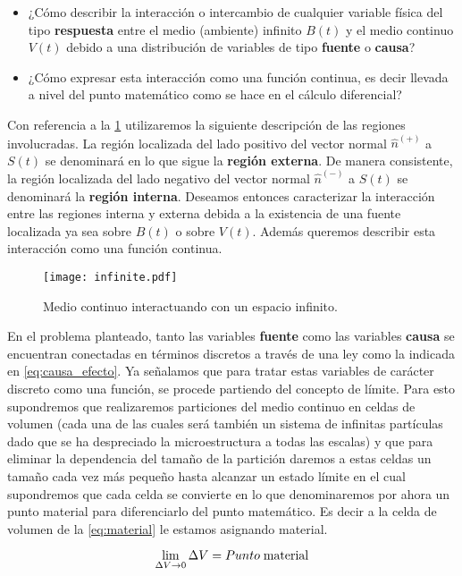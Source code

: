 \documentclass[../notas medios.tex]{subfiles}
\begin{document}
\begin{itemize}
\item ¿Cómo describir la interacción o intercambio de cualquier variable física
del tipo {\bf respuesta} entre el medio (ambiente) infinito  $B(t)$ y el medio 
continuo $V(t)$ debido a una distribución de variables de tipo {\bf fuente} o 
{\bf causa}?

\item ¿Cómo expresar esta interacción como una función continua, es decir
llevada a nivel del punto matemático como se hace en el cálculo diferencial?
\end{itemize}

Con referencia a la \cref{eq:infinito} utilizaremos la siguiente descripción de 
las regiones involucradas.  La región localizada del lado positivo del vector 
normal ${\hat n^{(+)}}$ a $S(t)$ se denominará en lo que sigue la {\bf región 
externa}.  De manera consistente, la región localizada del lado negativo del 
vector normal ${\hat n^{(-)}}$ a $S(t)$ se denominará la {\bf región interna}.  
Deseamos entonces caracterizar la interacción entre las regiones interna y 
externa debida a la existencia de una fuente localizada ya sea sobre $B(t)$ o 
sobre  $V(t)$. Además queremos describir esta interacción como una función 
continua.
\begin{figure}[H]
\centering
\texttt{[image: infinite.pdf]}
\caption{Medio continuo interactuando con un espacio infinito.}
\label{eq:infinito}
\end{figure}

En el problema planteado, tanto las variables {\bf fuente} como las variables
{\bf causa} se encuentran conectadas en términos discretos a través de una ley
como la indicada en \cref{eq:causa_efecto}. Ya señalamos que para tratar estas 
variables 
de carácter discreto  como una función, se procede partiendo del concepto de 
límite.  Para esto supondremos que realizaremos particiones del medio continuo 
en celdas de volumen (cada una de las cuales será también un sistema de 
infinitas partículas dado que se ha despreciado la microestructura a todas las 
escalas) y que para eliminar la dependencia del tamaño de la partición daremos 
a estas celdas un tamaño cada vez más pequeño hasta alcanzar un estado límite 
en el cual supondremos que cada celda se convierte en lo que denominaremos por 
ahora un punto material para diferenciarlo del punto matemático.  Es decir a la 
celda de volumen de la \cref{eq:material} le estamos asignando material.

\begin{equation}
\lim_{\Delta V \to 0} \Delta V = Punto\; {\rm{ material}}
\label{eq:material}
\end{equation}
\end{document}
